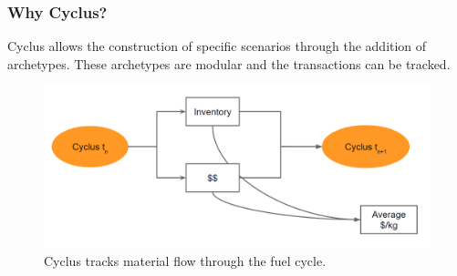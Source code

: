 \begin{frame}
\frametitle{Why Cyclus?}
	Cyclus allows the construction of specific scenarios through the addition of archetypes. These archetypes are
	modular and the transactions can be tracked.
	\begin{figure}
		\centering
		\includegraphics[width=0.9\linewidth]{cyclus-material-track}
		\caption{Cyclus tracks material flow through the fuel cycle.}
		\label{fig:tracking}
	\end{figure}
\end{frame}

